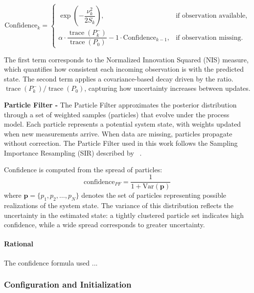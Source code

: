 \begin{equation}
\label{eq:hybrid_confidence_cov}
\mathrm{Confidence}_k =
\begin{cases}
\exp\!\left(-\dfrac{\nu_k^2}{2 S_k}\right), 
& \text{if observation available}, \\[10pt]
\alpha \cdot 
\dfrac{\operatorname{trace}(P_k^-)}{\operatorname{trace}(P_0)} - 1
\cdot \mathrm{Confidence}_{k-1}, 
& \text{if observation missing.}
\end{cases}
\end{equation}

The first term corresponds to the Normalized Innovation Squared (NIS) measure, which quantifies how consistent each incoming observation is with the predicted state.
The second term applies a covariance-based decay driven by the ratio. $\operatorname{trace}(P_k^-)/\operatorname{trace}(P_0)$, 
capturing how uncertainty increases between updates. 



\vspace{0.5em}
\noindent\textbf{Particle Filter -}  
The Particle Filter approximates the posterior distribution through a set of weighted samples (particles) that evolve under the process model.  
Each particle represents a potential system state, with weights updated when new measurements arrive.  
When data are missing, particles propagate without correction.  
The Particle Filter used in this work follows the Sampling Importance Resampling (SIR) described by ~\cite{arulampalam2002tutorial}.

Confidence is computed from the spread of particles:
\[
\text{confidence}_{PF} = \frac{1}{1 + \text{Var}(\boldsymbol{p})}
\]
where \(\boldsymbol{p} = \{p_1, p_2, \ldots, p_N\}\) denotes the set of particles representing possible realizations of the system state. The variance of this distribution reflects the uncertainty in the estimated state: a tightly clustered particle set indicates high confidence, while a wide spread corresponds to greater uncertainty.

\paragraph{Rational} The confidence formula used ...


\subsubsection{Configuration and Initialization} 
\label{sec:predictor_config}

